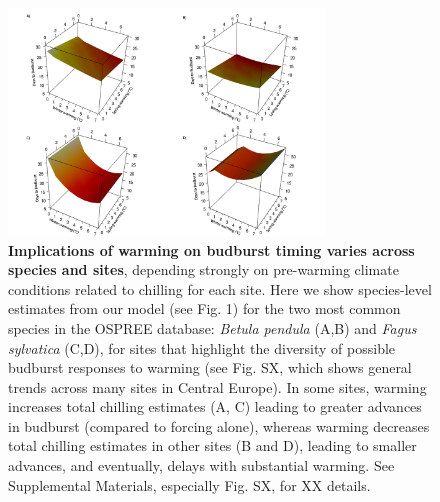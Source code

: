 \documentclass{article}
\begin{document}
\begin{figure}[h!]
\centering
\noindent \includegraphics[width=0.75\textwidth]{..//..//analyses/bb_analysis/figures/forecasting/tempforecastbothspp_1_7_degwarm_3D_utah.png}
\caption{\textbf{Implications of warming on budburst timing varies across species and sites}, depending strongly on pre-warming climate conditions related to chilling for each site. Here we show species-level estimates from our model (see Fig. 1) for the two most common species in the OSPREE database: \emph{Betula pendula} (A,B) and \emph{Fagus sylvatica} (C,D), for sites that highlight the diversity of possible budburst responses to warming (see Fig. SX, which shows general trends across many sites in Central Europe). In some sites, warming increases total chilling estimates (A, C) leading to greater advances in budburst (compared to forcing alone), whereas warming decreases total chilling estimates in other sites (B and D), leading to smaller advances, and eventually, delays with substantial warming. See Supplemental Materials, especially Fig. SX, for XX details.}
\label{fig:fore}
\end{figure}

\end{document}
